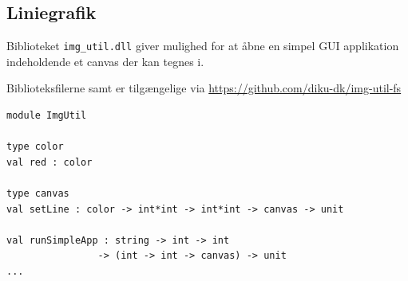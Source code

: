 \documentclass[rgb]{beamer}
\begin{document}
\subsection{Liniegrafik}

\begin{frame}[fragile]
\begin{footnotesize}


  Biblioteket \lstinline{img_util.dll} giver mulighed for at åbne en
  simpel GUI applikation indeholdende et canvas der kan tegnes i.

  \vspace{1ex}
  Biblioteksfilerne  samt
   er tilgængelige via
  \url{https://github.com/diku-dk/img-util-fs}

  \vspace{1ex}

  \hspace{.75\textwidth}

  \vspace{-28mm}

\begin{lstlisting}[numbers=none,frame=none,mathescape]
module ImgUtil

type color
val red : color

type canvas
val setLine : color -> int*int -> int*int -> canvas -> unit

val runSimpleApp : string -> int -> int
                -> (int -> int -> canvas) -> unit
...
\end{lstlisting}

\end{footnotesize}
\end{frame}
\end{document}
